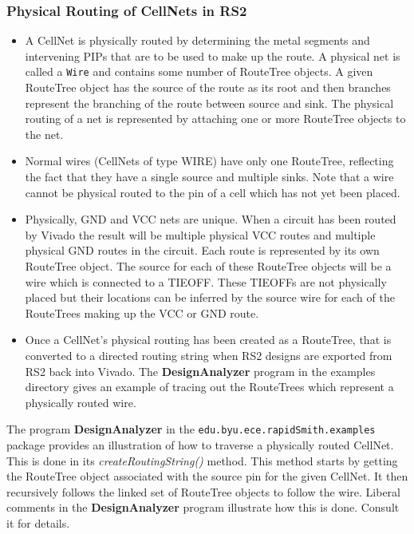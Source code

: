 \documentclass[12pt]{article}
\newcommand{\cls}[1]{{\texttt{#1}}}
\newcommand{\pkg}[1]{{\texttt{#1}}}
\newcommand{\pgm}[1]{{\textbf{#1}}}
\newcommand{\sbr}[1]{{\em #1}}
\begin{document}
\subsubsection{Physical Routing of CellNets in RS2}
\begin{itemize}
  \item A CellNet is physically routed by determining the metal segments and
  intervening PIPs that are to be used to make up the route.  A physical net is
  called a \cls{Wire} and contains some number of RouteTree objects.  A given
  RouteTree object has the source of the route as its root and then branches
  represent the branching of the route between source and sink. The physical
  routing of a net is represented by attaching one or more RouteTree objects to
  the net.
  \item Normal wires (CellNets of type WIRE) have only one RouteTree, reflecting
  the fact that they have a single source and multiple sinks.  Note that a wire
  cannot be physical routed to the pin of a cell which has not yet been placed.
  \item Physically, GND and VCC nets are unique.  When a
  circuit has been routed by Vivado the result will be multiple physical VCC routes and multiple physical GND
  routes in the circuit.  Each route is represented by its own RouteTree object.
  The source for each of these RouteTree objects will be a wire which is
  connected to a TIEOFF.  These TIEOFFs are not physically placed but their
  locations can be inferred by the source wire for each of the RouteTrees making
  up the VCC or GND route.
  \item Once a CellNet's physical routing has been created as a RouteTree, that
  is converted to a directed routing string when RS2 designs are exported from
  RS2 back into Vivado.  The \pgm{DesignAnalyzer} program in the examples
  directory gives an example of tracing out the RouteTrees which represent a physically
  routed wire.                       
\end{itemize}
The program \pgm{DesignAnalyzer} in the \pkg{edu.byu.ece.rapidSmith.examples}
package provides an illustration of how to traverse a physically routed CellNet.  This
is done in its \sbr{createRoutingString()} method.  This method starts by
getting the RouteTree object associated with the source pin for the given CellNet.  It then
recursively follows the linked set of RouteTree objects to follow the wire. 
Liberal comments in the \pgm{DesignAnalyzer} program illustrate how this is
done.
Consult it for details.
\end{document}
